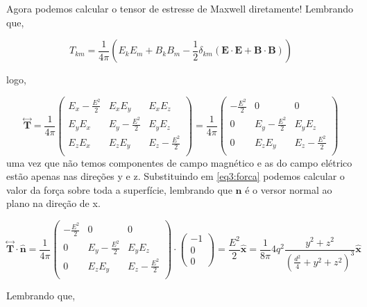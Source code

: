 Agora podemos calcular o tensor de estresse de Maxwell diretamente! Lembrando que,

\begin{equation}
	T_{km} = \frac{1}{4\pi}\left(E_k E_m + B_k B_m - \frac{1}{2}\delta_{km}\left(\textbf{E}\cdot\textbf{E}+\textbf{B}\cdot\textbf{B} \right)  \right) 
\end{equation}

logo,

\begin{equation}
	\overset{\leftrightarrow}{\textbf{T}} = \frac{1}{4\pi}
	\begin{pmatrix}
		E_x - \frac{E^2}{2} & E_xE_y & E_xE_z\\
		E_yE_x & E_y - \frac{E^2}{2} & E_yE_z\\
		E_zE_x & E_zE_y & E_z - \frac{E^2}{2}\\
	\end{pmatrix}
	= \frac{1}{4\pi}
	\begin{pmatrix}
		- \frac{E^2}{2} & 0 & 0\\
		0 & E_y - \frac{E^2}{2} & E_yE_z\\
		0 & E_zE_y & E_z - \frac{E^2}{2}\\
	\end{pmatrix}
\end{equation}
uma vez que não temos componentes de campo magnético e as do campo elétrico estão apenas nas direções y e z. Substituindo em \ref{eq3:forca} podemos calcular o valor da força sobre toda a superfície, lembrando que $\hat{\textbf{n}}$ é o versor normal ao plano na direção de x.

\begin{equation}
	\overset{\leftrightarrow}{\textbf{T}}\cdot\hat{\textbf{n}} = \frac{1}{4\pi}
	\begin{pmatrix}
		- \frac{E^2}{2} & 0 & 0\\
		0 & E_y - \frac{E^2}{2} & E_yE_z\\
		0 & E_zE_y & E_z - \frac{E^2}{2}\\
	\end{pmatrix} \cdot
	\begin{pmatrix}
		-1\\0\\0
	\end{pmatrix} =
	\frac{E^2}{2} \hat{\textbf{x}} = \frac{1}{8\pi}4q^2 \frac{y^2 + z^2}{\left(\frac{d^2}{4} + y^2 + z^2 \right)^{3} }\hat{\textbf{x}}
\end{equation}

Lembrando que,

